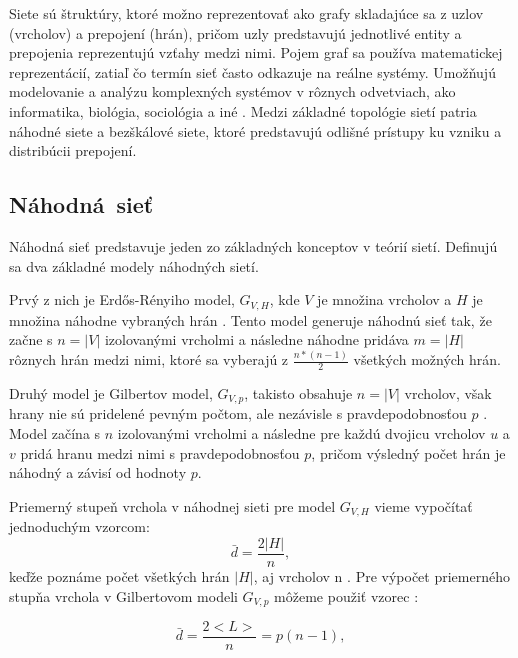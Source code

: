 Siete sú štruktúry, ktoré možno reprezentovať ako grafy skladajúce sa z uzlov (vrcholov) a prepojení (hrán), pričom uzly predstavujú jednotlivé entity
a prepojenia reprezentujú vzťahy medzi nimi. Pojem graf sa používa matematickej reprezentácií, zatiaľ čo termín sieť
často odkazuje na reálne systémy. Umožňujú modelovanie a analýzu komplexných systémov v rôznych odvetviach,
ako informatika, biológia, sociológia a iné \cite{barabasi2016network} . Medzi základné topológie sietí patria náhodné siete a bezškálové siete,
ktoré predstavujú odlišné prístupy ku vzniku a distribúcii prepojení.


\subsection{Náhodná~sieť}\label{sec:random-network}

Náhodná sieť predstavuje jeden zo základných konceptov v teórií sietí. Definujú sa dva základné modely náhodných sietí.

Prvý z nich je Erdős-Rényiho model, $G_{V,H}$, kde $V$ je množina vrcholov a $H$ je množina náhodne vybraných hrán \cite{erdos1959random}\cite{barabasi2016network} .
Tento model generuje náhodnú sieť tak, že začne s $n = |V|$ izolovanými vrcholmi a následne náhodne pridáva $m = |H|$ rôznych hrán medzi nimi,
ktoré sa vyberajú z $\frac{n*(n-1)}{2}$ všetkých možných hrán.

Druhý model je Gilbertov model, $G_{V,p}$, takisto obsahuje $n = |V|$ vrcholov, však hrany nie sú pridelené pevným počtom,
ale nezávisle s pravdepodobnosťou $p$ \cite{gilbert1959random}\cite{barabasi2016network} . Model začína s $n$ izolovanými vrcholmi a následne pre každú dvojicu vrcholov
$u$ a $v$ pridá hranu medzi nimi s pravdepodobnosťou $p$, pričom výsledný počet hrán je náhodný a závisí od hodnoty $p$.

Priemerný stupeň vrchola v náhodnej sieti pre model $G_{V,H}$ vieme vypočítať jednoduchým vzorcom:
\begin{equation}
    \bar{d} = \frac{2|H|}{n},
    \label{eq:avg_degree_random}
\end{equation}
keďže poznáme počet všetkých hrán $|H|$, aj vrcholov n \cite{barabasi2016network} . Pre výpočet priemerného stupňa vrchola
v Gilbertovom modeli $G_{V,p}$ môžeme použiť vzorec \cite{barabasi2016network} :

\begin{equation}
    \bar{d} = \frac{2<L>}{n} = p(n-1),
    \label{eq:avg_degree_gilbert}
\end{equation}

